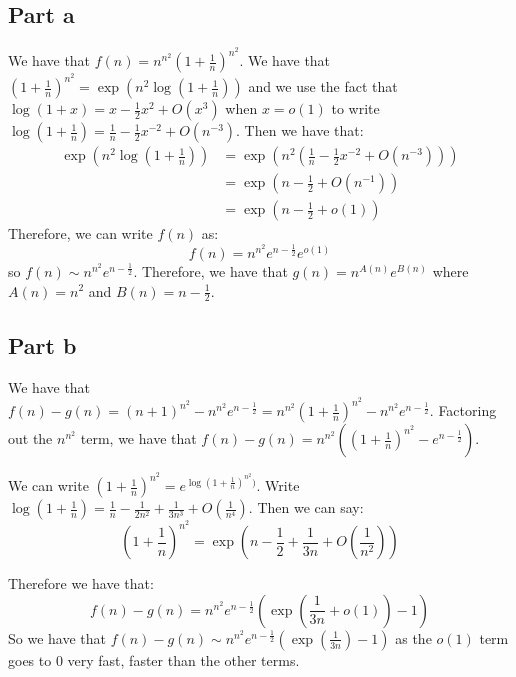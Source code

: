 \documentclass[]{article}
\begin{document}
\subsection{Part a}
We have that $f(n) = n^{n^2}(1 + \frac{1}{n})^{n^2}$. We have that $(1 + \frac{1}{n})^{n^2} = \exp\left(n^2 \log(1 + \frac{1}{n})\right)$ and we use the fact that $\log(1 + x) = x - \frac{1}{2}x^2 + O(x^3)$ when $x = o(1)$ to write $\log(1 + \frac{1}{n}) = \frac{1}{n} - \frac{1}{2}x^{-2} + O(n^{-3})$. Then we have that:
\begin{align*}
	\exp\left(n^2 \log(1 + \frac{1}{n})\right) &= \exp\left(n^2 \left(\frac{1}{n} - \frac{1}{2}x^{-2} + O(n^{-3}) \right)\right)\\
	&=  \exp\left( n  - \frac{1}{2}+ O(n^{-1})\right)\\
	&= \exp\left( n  - \frac{1}{2}+ o(1)\right)
\end{align*}
Therefore, we can write $f(n)$ as:
\begin{equation}
	f(n) = n^{n^2}e^{n - \frac{1}{2}}e^{o(1)}
\end{equation}
so $f(n) \sim n^{n^2}e^{n - \frac{1}{2}}$. 
Therefore, we have that $g(n) = n^{A(n)}e^{B(n)}$ where $A(n) = n^2$ and $B(n) = n - \frac{1}{2}$. 

\subsection{Part b}
We have that $f(n) - g(n) = (n + 1)^{n^2} - n^{n^2}e^{n - \frac{1}{2}} = n^{n^2}(1 + \frac{1}{n})^{n^2} - n^{n^2}e^{n - \frac{1}{2}}$. Factoring out the $n^{n^2}$ term, we have that $f(n) - g(n) = n^{n^2}\left((1 + \frac{1}{n})^{n^2} - e^{n - \frac{1}{2}} \right)$.

We can write $(1 + \frac{1}{n})^{n^2} = e^{\log(1 + \frac{1}{n})^{n^2})}$. Write $\log(1 + \frac{1}{n}) = \frac{1}{n} - \frac{1}{2 n^2} + \frac{1}{3 n^3} + O(\frac{1}{n^4})$. Then we can say:
\begin{equation}
	(1 + \frac{1}{n})^{n^2} = \exp(n - \frac{1}{2} + \frac{1}{3n} + O(\frac{1}{n^2}))
\end{equation}

Therefore we have that:
\begin{equation}
	f(n) - g(n) =  n^{n^2}e^{n - \frac{1}{2}} \left(\exp(\frac{1}{3n} + o(1)) - 1\right)
\end{equation}
So we have that $f(n) - g(n) \sim n^{n^2}e^{n - \frac{1}{2}} \left(\exp(\frac{1}{3n}) - 1\right)$ as the $o(1)$ term goes to 0 very fast, faster than the other terms. 
\end{document}
